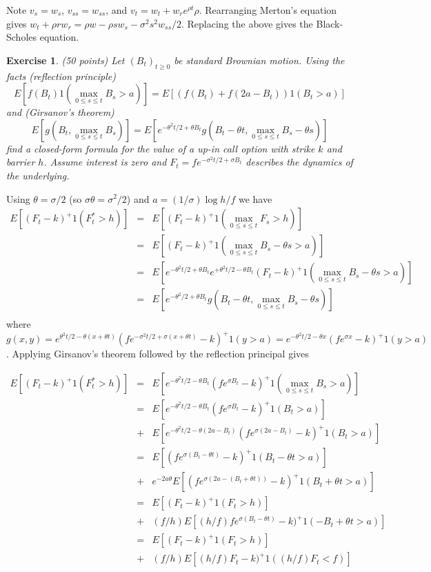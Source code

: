 \documentclass[11pt,fleqn]{amsproc}
\newtheorem{xca}{Exercise}
\begin{document}
Note $v_s = w_s$, $v_{ss} = w_{ss}$, and
$v_t = w_t + w_r e^{\rho t}\rho$.
Rearranging Merton's equation gives
$w_t + \rho r w_r = \rho w - \rho s w_s - \sigma^2 s^2 w_{ss}/2$.
Replacing the above gives the Black-Scholes equation.

\begin{xca}{(50 points)}
Let $(B_t)_{t\ge0}$ be standard Brownian motion. Using the
facts (reflection principle)
\begin{equation*}
E[f(B_t)1(\max_{0\le s\le t}B_s > a)]
= E[(f(B_t) + f(2a - B_t))1(B_t > a)]
\end{equation*}
and (Girsanov's theorem)
\begin{equation*}
E[g(B_t, \max_{0\le s\le t}B_s)]
= E[e^{-\theta^2 t/2 + \theta B_t}
g(B_t - \theta t, \max_{0\le s\le t}B_s - \theta s)]
\end{equation*}
find a closed-form formula for the value of a up-in call option
with strike $k$ and barrier $h$.
Assume interest is zero and
$F_t = fe^{-\sigma^2 t/2 + \sigma B_t}$ describes the
dynamics of the underlying.
\end{xca}

Using $\theta = \sigma/2$ (so $\sigma\theta = \sigma^2/2$)
and $a = (1/\sigma)\log h/f$ we have
\begin{eqnarray*}
E[(F_t - k)^+1(F_t^* > h)]
&=& E[(F_t - k)^+1(\max_{0\le s\le t} F_s > h)]\\
&=& E[(F_t - k)^+1(\max_{0\le s\le t} B_s - \theta s > a)]\\
&=& E[e^{-\theta^2t/2 + \theta B_t}e^{+\theta^2t/2 - \theta B_t}
	(F_t - k)^+ 1(\max_{0\le s\le t} B_s - \theta s> a)]\\
&=& E[e^{-\theta^2/2 + \theta B_t}
g(B_t - \theta t, \max_{0\le s\le t}B_s - \theta s)]\\
\end{eqnarray*}
where $g(x, y) = e^{\theta^2t/2 - \theta (x + \theta t)}
(fe^{-\sigma^2t/2 + \sigma(x + \theta t)} - k)^+
1(y > a)= e^{-\theta^2t/2 - \theta x}(fe^{\sigma x} - k)^+
1(y > a)$. Applying Girsanov's theorem followed by the
reflection principal gives

\begin{eqnarray*}
E[(F_t - k)^+1(F_t^* > h)]
&=& E[e^{-\theta^2t/2 - \theta B_t}
(fe^{\sigma B_t} - k)^+
1(\max_{0\le s\le t} B_s > a)]\\
&=& E[e^{-\theta^2t/2 - \theta B_t}
(fe^{\sigma B_t} - k)^+
1(B_t > a)]\\
&+& E[e^{-\theta^2t/2 - \theta (2a - B_t)}
(fe^{\sigma (2a - B_t)} - k)^+
1(B_t > a)]\\
&=& E[(fe^{\sigma (B_t - \theta t)} - k)^+
1(B_t - \theta t > a)]\\
&+& e^{-2a\theta}E[(fe^{\sigma (2a - (B_t + \theta t))} - k)^+
1(B_t + \theta t > a)]\\
&=& E[(F_t - k)^+
1(F_t > h)]\\
&+& (f/h)E[(h/f)fe^{\sigma (B_t - \theta t)} - k)^+
1(-B_t + \theta t > a)]\\
&=& E[(F_t - k)^+
1(F_t > h)]\\
&+& (f/h)E[(h/f)F_t - k)^+
1((h/f)F_t < f)]\\
\end{eqnarray*}
\end{document}
